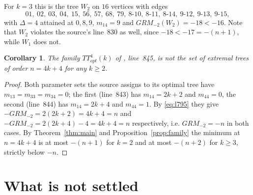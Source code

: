 \documentclass[11pt]{amsart}
\newtheorem{corollary}[theorem]{Corollary}
\begin{document}
For $k=3$ this is the tree $W_2$ on $16$ vertices with edges
\[
 01,\ 02,\ 03,\ 04,\ 15,\ 56,\ 57,\ 68,\ 79,\ 8\text{-}10,\ 8\text{-}11,\ 8\text{-}14,\
 9\text{-}12,\ 9\text{-}13,\ 9\text{-}15,
\]
with $\Delta=4$ attained at $0,8,9$, $m_{14}=9$ and $GRM_{-2}(W_2)=-18<-16$. Note that $W_2$
violates the source's line~830 as well, since $-18<-17=-(n+1)$, while $W_1$ does not.

\begin{corollary}
The family $TT^4_{opt}(k)$ of \textup{\cite{BasicIlic}}, line~845, is not the set of extremal
trees of order $n=4k+4$ for any $k\ge 2$.
\end{corollary}

\begin{proof}
Both parameter sets the source assigns to its optimal tree have $m_{13}=m_{33}=m_{34}=0$; the
first (line~843) has $m_{14}=2k+2$ and $m_{44}=0$, the second (line~844) has $m_{14}=2k+4$ and
$m_{44}=1$. By \eqref{eq:l795} they give $-GRM_{-2}=2(2k+2)=4k+4=n$ and
$-GRM_{-2}=2(2k+4)-4=4k+4=n$ respectively, i.e. $GRM_{-2}=-n$ in both cases. By
Theorem~\ref{thm:main} and Proposition~\ref{prop:family} the minimum at $n=4k+4$ is at most
$-(n+1)$ for $k=2$ and at most $-(n+2)$ for $k\ge 3$, strictly below $-n$.
\end{proof}

\section{What is not settled}\label{sec:open}
\end{document}
